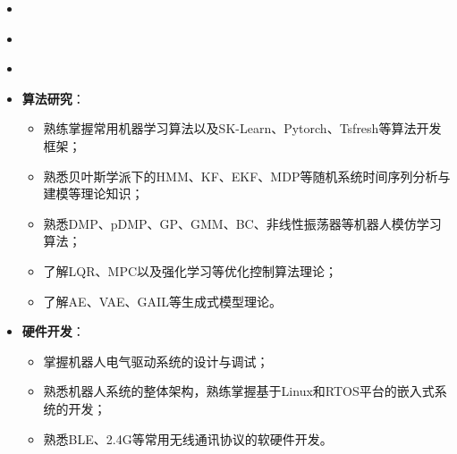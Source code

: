 \begin{itemize}[leftmargin=*]
  \item {}
\end{itemize}

\vspace{-1mm}
\begin{itemize}[leftmargin=*]
  \item {}
\end{itemize}

\vspace{-1mm}
\begin{itemize}[leftmargin=*]
  \item {}
\end{itemize}

\vspace{-1mm}
\begin{itemize}[leftmargin=*]
  \item \textbf{算法研究}：
  {\small
  \begin{itemize}
    \item 熟练掌握常用机器学习算法以及SK-Learn、Pytorch、Tsfresh等算法开发框架；
    \item 熟悉贝叶斯学派下的HMM、KF、EKF、MDP等随机系统时间序列分析与建模等理论知识；
    \item 熟悉DMP、pDMP、GP、GMM、BC、非线性振荡器等机器人模仿学习算法；
    \item 了解LQR、MPC以及强化学习等优化控制算法理论；
    \item 了解AE、VAE、GAIL等生成式模型理论。
  \end{itemize}}
\end{itemize}

\vspace{-3mm}
\begin{itemize}[leftmargin=*]
  \item \textbf{硬件开发}：
  {\small
  \begin{itemize}
    \item 掌握机器人电气驱动系统的设计与调试；
    \item 熟悉机器人系统的整体架构，熟练掌握基于Linux和RTOS平台的嵌入式系统的开发；
    \item 熟悉BLE、2.4G等常用无线通讯协议的软硬件开发。
  \end{itemize}}
\end{itemize}

